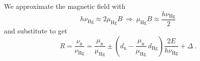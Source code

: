 We approximate the magnetic field with
\begin{equation}
   h \nu_\text{Hg} \approx 2 \mu_\text{Hg} B \ \Rightarrow \ \mu_\text{Hg} B \approx \frac{h \nu_\text{Hg}}{2}
\end{equation}
and substitute to get
\begin{equation}
  R = \frac{\nu_\text{n}}{\nu_\text{Hg}} = \frac{\mu_\text{n}}{\mu_\text{Hg}} \pm \left( d_\text{n} - \frac{\mu_\text{n}}{\mu_\text{Hg}} \, d_\text{Hg} \right) \frac{2 E}{ h  \nu_\text{Hg}} + \Delta \ .
\end{equation}
